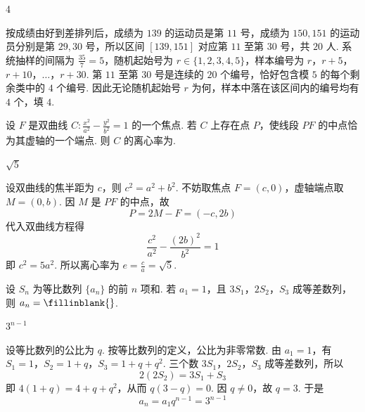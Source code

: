 \begin{answer}
4
\end{answer}

\begin{solution}
按成绩由好到差排列后，成绩为 \(139\) 的运动员是第 \(11\) 号，成绩为 \(150,151\) 的运动员分别是第 \(29,30\) 号，所以区间 \([139,151]\) 对应第 \(11\) 至第 \(30\) 号，共 \(20\) 人. 系统抽样的间隔为 \(\frac{35}{7}=5\)，随机起始号为 \(r\in\{1,2,3,4,5\}\)，样本编号为
\(r\)，\(r+5\)，\(r+10\)，\(\ldots\)，\(r+30\).
第 \(11\) 至第 \(30\) 号是连续的 \(20\) 个编号，恰好包含模 \(5\) 的每个剩余类中的 \(4\) 个编号. 因此无论随机起始号 \(r\) 为何，样本中落在该区间内的编号均有 \(4\) 个，填 \(4\).
\end{solution}

\begin{problem}
设 \(F\) 是双曲线 \(C: \frac{x^2}{a^2} - \frac{y^2}{b^2} = 1\) 的一个焦点. 若 \(C\) 上存在点 \(P\)，使线段 \(PF\) 的中点恰为其虚轴的一个端点. 则 \(C\) 的离心率为\fillinblank{}.
\end{problem}

\begin{answer}
\(\sqrt{5}\)
\end{answer}

\begin{solution}
设双曲线的焦半距为 \(c\)，则 \(c^2=a^2+b^2\). 不妨取焦点 \(F=(c,0)\)，虚轴端点取 \(M=(0,b)\). 因 \(M\) 是 \(PF\) 的中点，故
\[
P=2M-F=(-c,2b)
\]
代入双曲线方程得
\[
\frac{c^2}{a^2}-\frac{(2b)^2}{b^2}=1
\]
即 \(c^2=5a^2\). 所以离心率为 \(e=\frac{c}{a}=\sqrt5\).
\end{solution}

\begin{problem}
设 \(S_{n}\) 为等比数列 \(\{a_{n}\}\) 的前 \(n\) 项和. 若 \(a_{1} = 1\)，且 \(3S_{1}\)，\(2S_{2}\)，\(S_{3}\) 成等差数列，则 \(a_{n} =\fillinblank{}\).
\end{problem}

\begin{answer}
\(3^{n-1}\)
\end{answer}

\begin{solution}
设等比数列的公比为 \(q\). 按等比数列的定义，公比为非零常数. 由 \(a_1=1\)，有
\(S_1=1\)，\(S_2=1+q\)，\(S_3=1+q+q^2\).
三个数 \(3S_1\)，\(2S_2\)，\(S_3\) 成等差数列，所以
\[
2(2S_2)=3S_1+S_3
\]
即 \(4(1+q)=4+q+q^2\)，从而 \(q(3-q)=0\). 因 \(q\ne0\)，故 \(q=3\). 于是
\[
a_n=a_1q^{n-1}=3^{n-1}
\]
\end{solution}

